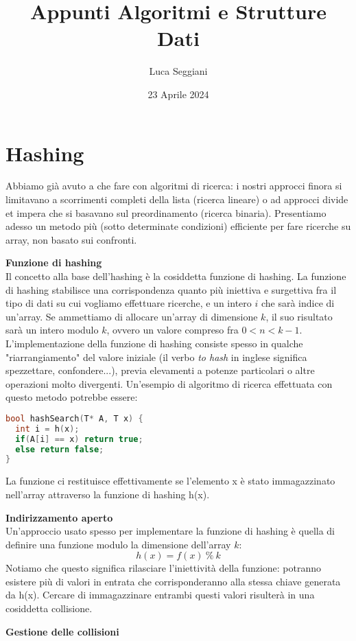 \documentclass[a4paper,12pt]{article}
\title{Appunti Algoritmi e Strutture Dati}
\author{Luca Seggiani}
\date{23 Aprile 2024}
\begin{document}
\maketitle
\section{Hashing}
Abbiamo già avuto a che fare con algoritmi di ricerca: i nostri approcci finora si limitavano a scorrimenti
completi della lista (ricerca lineare) o ad approcci divide et impera che si basavano sul preordinamento (ricerca binaria).
Presentiamo adesso un metodo più (sotto determinate condizioni) efficiente per fare ricerche su array, non basato sui confronti.
\par\smallskip
\textbf{Funzione di hashing} \\
Il concetto alla base dell'hashing è la cosiddetta funzione di hashing. La funzione di hashing stabilisce una corrispondenza
quanto più iniettiva e surgettiva fra il tipo di dati su cui vogliamo effettuare ricerche, e un intero $i$ che sarà indice di un'array.
Se ammettiamo di allocare un'array di dimensione $k$, il suo risultato sarà un intero modulo $k$, ovvero un valore compreso fra
$0 < n < k-1$. L'implementazione della funzione di hashing consiste spesso in qualche "riarrangiamento" del valore iniziale (il
verbo \textit{to hash} in inglese significa spezzettare, confondere...), previa elevamenti a potenze particolari o altre operazioni
molto divergenti. Un'esempio di algoritmo di ricerca effettuata con questo metodo potrebbe essere:
\begin{lstlisting}[language=C++]
bool hashSearch(T* A, T x) {
  int i = h(x);
  if(A[i] == x) return true;
  else return false;
}
\end{lstlisting}
La funzione ci restituisce effettivamente se l'elemento x è stato immagazzinato nell'array attraverso la funzione di hashing h(x).
\par\smallskip
\textbf{Indirizzamento aperto} \\
Un'approccio usato spesso per implementare la funzione di hashing è quella di definire una funzione modulo la dimensione dell'array $k$:
$$ h(x) = f(x) \ \% \  k$$
Notiamo che questo significa rilasciare l'iniettività della funzione: potranno esistere più di valori in entrata che corrisponderanno alla stessa chiave generata
da h(x). Cercare di immagazzinare entrambi questi valori risulterà in una cosiddetta collisione.
\par\smallskip
\textbf{Gestione delle collisioni} \\
\end{document}
